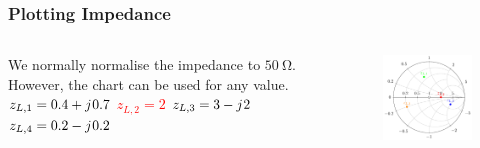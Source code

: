 \documentclass[10pt, compress]{beamer}
\renewcommand{\j}{{j}\mkern1mu} %
\begin{document}
\begin{frame}
    \frametitle{Plotting Impedance}
    \begin{columns}[T] %
        \begin{column}{.4\textwidth}
            \begin{outline}
                \1 We normally normalise the impedance to $\SI{50}{\ohm}$.
                \1 However, the chart can be used for any value.
                \1 \textcolor{green}{$z_{L,1} = 0.4 + \j 0.7$}
                \1 \textcolor{red}{$z_{L,2} = 2 $}
                \1 \textcolor{blue}{$z_{L,3} = 3 - \j 2$}
                \1 \textcolor{orange}{$z_{L,4} = 0.2 - \j 0.2$}
            \end{outline}
        \end{column}
        \begin{column}[T]{.6\textwidth}
            \begin{figure}
                \centering
                \includegraphics[width=1\textwidth]{smith simple impedances.pdf}
            \end{figure}
        \end{column}%
    \end{columns}
\end{frame}
\end{document}
